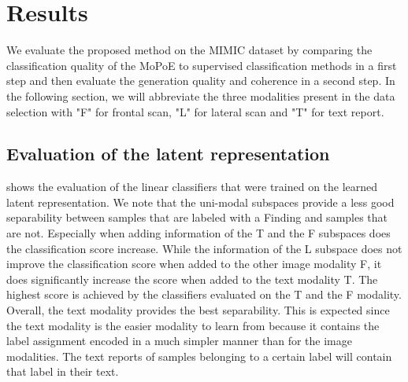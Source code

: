 \section{Results}

We evaluate the proposed method on the MIMIC dataset by comparing the classification quality of the MoPoE to supervised classification methods in a first step and then evaluate the generation quality and coherence in a second step.
In the following section, we will abbreviate the three modalities present in the data selection with "F" for frontal scan, "L" for lateral scan and "T" for text report.



\subsection{Evaluation of the latent representation}



 shows the evaluation of the linear classifiers that were trained on the learned latent representation.
We note that the uni-modal subspaces provide a less good separability between samples that are labeled with a Finding and samples that are not.
Especially when adding information of the T and the F subspaces does the classification score increase.
While the information of the L subspace does not improve the classification score when added to the other image modality F, it does significantly increase the score when added to the text modality T.
The highest score is achieved by the classifiers evaluated on the T and the F modality.
Overall, the text modality provides the best separability.
This is expected since the text modality is the easier modality to learn from because it contains the label assignment encoded in a much simpler manner than for the image modalities.
The text reports of samples belonging to a certain label will contain that label in their text.

